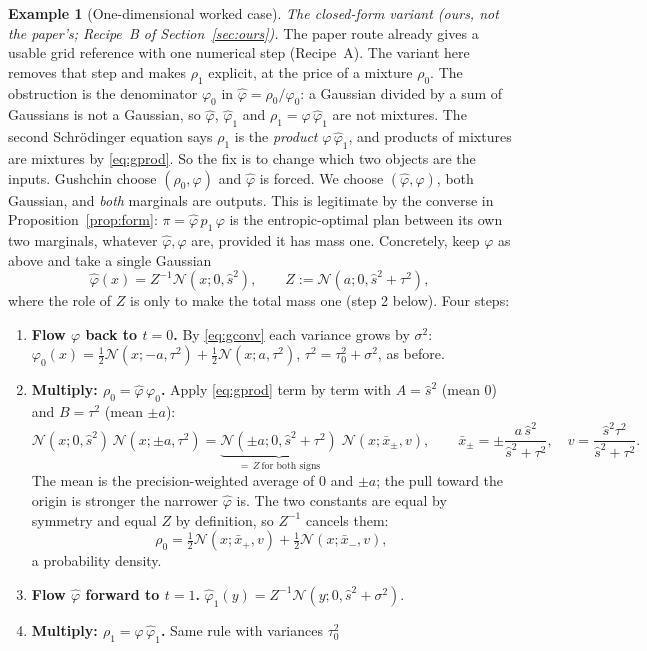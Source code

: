 \documentclass[11pt]{article}
\newcommand{\Nc}{\mathcal{N}}
\newcommand{\hphi}{\hat\varphi}
\theoremstyle{definition}
\newtheorem{example}[definition]{Example}
\theoremstyle{plain}
\begin{document}
\begin{example}[One-dimensional worked case]
\emph{The closed-form variant (ours, not the paper's; Recipe~B of Section~\ref{sec:ours}).}
The paper route already gives a usable grid reference with one numerical step (Recipe~A). The
variant here removes that step and makes $\rho_1$ explicit, at the price of a mixture
$\rho_0$. The obstruction is the denominator
$\varphi_0$ in $\hphi=\rho_0/\varphi_0$: a Gaussian divided by a sum of Gaussians is not a
Gaussian, so $\hphi$, $\hphi_1$ and $\rho_1=\varphi\,\hphi_1$ are not mixtures. The second
Schr\"odinger equation says $\rho_1$ is the \emph{product} $\varphi\,\hphi_1$, and products of
mixtures are mixtures by \eqref{eq:gprod}. So the fix is to change which two objects are the
inputs. Gushchin choose $(\rho_0,\varphi)$ and $\hphi$ is forced. We choose $(\hphi,\varphi)$,
both Gaussian, and \emph{both} marginals are outputs. This is legitimate by the converse in
Proposition~\ref{prop:form}: $\pi=\hphi\,p_1\,\varphi$ is the entropic-optimal plan between
its own two marginals, whatever $\hphi,\varphi$ are, provided it has mass one. Concretely, keep
$\varphi$ as above and take a single Gaussian
\[
  \hphi(x)=Z^{-1}\Nc(x;0,\hat s^2),\qquad Z:=\Nc(a;0,\hat s^2+\tau^2),
\]
where the role of $Z$ is only to make the total mass one (step 2 below). Four steps:
\begin{enumerate}
  \item \textbf{Flow $\varphi$ back to $t=0$.} By \eqref{eq:gconv} each variance grows by
        $\sigma^2$: $\varphi_0(x)=\tfrac12\Nc(x;-a,\tau^2)+\tfrac12\Nc(x;a,\tau^2)$,
        $\tau^2=\tau_0^2+\sigma^2$, as before.
  \item \textbf{Multiply: $\rho_0=\hphi\,\varphi_0$.} Apply \eqref{eq:gprod} term by term
        with $A=\hat s^2$ (mean $0$) and $B=\tau^2$ (mean $\pm a$):
        \[
          \Nc(x;0,\hat s^2)\,\Nc(x;\pm a,\tau^2)
          =\underbrace{\Nc(\pm a;0,\hat s^2+\tau^2)}_{=\,Z\ \text{for both signs}}\;
           \Nc(x;\bar x_\pm,v),\qquad
          \bar x_\pm=\pm\frac{a\,\hat s^2}{\hat s^2+\tau^2},\quad v=\frac{\hat s^2\tau^2}{\hat s^2+\tau^2}.
        \]
        The mean is the precision-weighted average of $0$ and $\pm a$; the pull toward the
        origin is stronger the narrower $\hphi$ is. The two constants are equal by symmetry
        and equal $Z$ by definition, so $Z^{-1}$ cancels them:
        \[
          \rho_0=\tfrac12\Nc(x;\bar x_+,v)+\tfrac12\Nc(x;\bar x_-,v),
        \]
        a probability density.
  \item \textbf{Flow $\hphi$ forward to $t=1$.} $\hphi_1(y)=Z^{-1}\Nc(y;0,\hat s^2+\sigma^2)$.
  \item \textbf{Multiply: $\rho_1=\varphi\,\hphi_1$.} Same rule with variances $\tau_0^2$

\end{enumerate}
\end{example}
\end{document}
